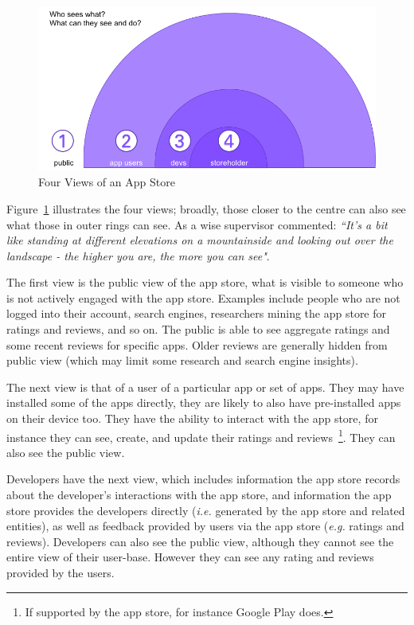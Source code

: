 \begin{figure}[htbp!]
    \centering
    \includegraphics[width=12cm]{images/who-sees-what.png}
    \caption{Four Views of an App Store}
    \label{fig:4-views-of-apps-in-app-store}
\end{figure}

Figure~\ref{fig:4-views-of-apps-in-app-store} illustrates the four views; broadly, those closer to the centre can also see what those in outer rings can see. As a wise supervisor commented: \emph{``It's a bit like standing at different elevations on a mountainside and looking out over the landscape - the higher you are, the more you can see"}.

The first view is the public view of the app store, what is visible to someone who is not actively engaged with the app store. Examples include people who are not logged into their account, search engines, researchers mining the app store for ratings and reviews, and so on. The public is able to see aggregate ratings and some recent reviews for specific apps. Older reviews are generally hidden from public view (which may limit some research and search engine insights).

The next view is that of a user of a particular app or set of apps. They may have installed some of the apps directly, they are likely to also have pre-installed apps on their device too. They have the ability to interact with the app store, for instance they can see, create, and update their ratings and reviews~\footnote{If supported by the app store, for instance Google Play does.}. They can also see the public view.

Developers have the next view, which includes information the app store records about the developer's interactions with the app store, and information the app store provides the developers directly (\emph{i.e.} generated by the app store and related entities), as well as feedback provided by users via the app store (\emph{e.g.} ratings and reviews). Developers can also see the public view, although they cannot see the entire view of their user-base. However they can see any rating and reviews provided by the users.

